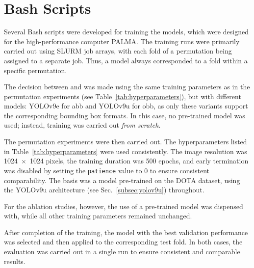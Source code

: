 \section{Bash Scripts}

Several Bash scripts were developed for training the models, which were designed for the high-performance computer \acrshort{PALMA}. The training runs were primarily carried out using \acrshort{SLURM} job arrays, with each fold of a permutation being assigned to a separate job. Thus, a model always corresponded to a fold within a specific permutation.  

The decision between  and  was made using the same training parameters as in the permutation experiments (see Table~\ref{tab:hyperparameters}), but with different models: \acrshort{YOLO}v9e for \acrshort{abb} and \acrshort{YOLO}v9u for \acrshort{obb}, as only these variants support the corresponding bounding box formats. In this case, no pre-trained model was used; instead, training was carried out \textit{from scratch}.
  
The permutation experiments were then carried out. The hyperparameters listed in Table~\ref{tab:hyperparameters} were used consistently. The image resolution was 1024~$\times$~1024 pixels, the training duration was 500 epochs, and early termination was disabled by setting the \texttt{patience} value to 0 to ensure consistent comparability. The basis was a model pre-trained on the \acrshort{DOTA} dataset, using the \acrshort{YOLO}v9u architecture (see Sec.~\ref{subsec:yolov9u}) throughout.
  
For the ablation studies, however, the use of a pre-trained model was dispensed with, while all other training parameters remained unchanged.  

After completion of the training, the model with the best validation performance was selected and then applied to the corresponding test fold. In both cases, the evaluation was carried out in a single run to ensure consistent and comparable results.
    



